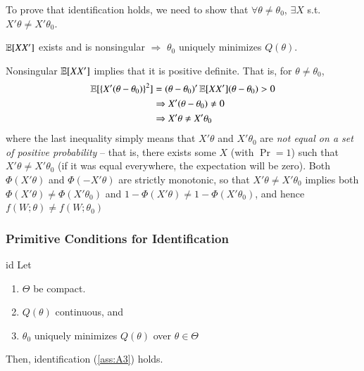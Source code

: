 \documentclass[../main.tex]{subfiles}
\begin{document}
\begin{enumerate}
	To prove that identification holds, we need to show that $\forall \theta \neq \theta_0$, $\exists X$ s.t. $X'\theta \neq X'\theta_0$.
	\begin{claim}
	$\operatorname{\mathbb{E}}[XX']$ exists and is nonsingular $\Rightarrow$ $\theta_0$ uniquely minimizes $Q(\theta)$.
	\end{claim}
	\begin{claimproof}
	Nonsingular $\operatorname{\mathbb{E}}[XX']$ implies that it is positive definite. That is, for $\theta \neq \theta_0$,
	\begin{align*}
		\operatorname{\mathbb{E}}[\{X'(\theta - \theta_0)\}^2] &= (\theta - \theta_0)'\operatorname{\mathbb{E}}[XX'](\theta - \theta_0)>0\\
										&\Rightarrow X'(\theta - \theta_0) \neq 0 \\
										&\Rightarrow X'\theta \neq X'\theta_0
	\end{align*}
	where the last inequality simply means that $X'\theta$ and $X'\theta_0$ are \emph{not equal on a set of positive probability} -- that is, there exists some $X$ (with $\Pr = 1$) such that $X'\theta \neq X'\theta_0$ (if it was equal everywhere, the expectation will be zero). Both $\Phi(X'\theta)$ and $\Phi(-X'\theta)$ are strictly monotonic, so that $X'\theta \neq X'\theta_0$ implies both $\Phi(X'\theta) \neq \Phi(X'\theta_0)$ and $1-\Phi(X'\theta) \neq 1-\Phi(X'\theta_0)$, and hence $f(W; \theta) \neq f(W; \theta_0)$
	\end{claimproof}

\end{enumerate}


\subsubsection{Primitive Conditions for Identification}
\begin{lem}{}{id}
Let
\begin{enumerate}[noitemsep]
	\item $\Theta$ be compact.
	\item $Q(\theta)$ continuous, and
	\item $\theta_0$ uniquely minimizes $Q(\theta)$ over $\theta \in \Theta$
\end{enumerate}
Then, identification (\cref{ass:A3}) holds.
\end{lem}
\end{document}
